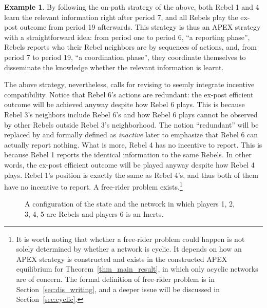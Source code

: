 \documentclass[12pt,letter]{article}
\theoremstyle{definition}
\newtheorem{example}{Example}
\theoremstyle{remark}
\theoremstyle{claim}
\begin{document}
\begin{example}
By following the on-path strategy of the above, both Rebel 1 and 4 learn the relevant information right after period 7, and all Rebels play the ex-post outcome from period 19 afterwards. This strategy is thus an APEX strategy with a straightforward idea: from period one to period 6, ``a {reporting phase}'', Rebels reports who their Rebel neighbors are by sequences of actions, and, from period 7 to period 19, ``a {coordination phase}'', they coordinate themselves to disseminate the knowledge whether the relevant information is learnt. 
\end{example}

The above strategy, nevertheless, calls for revising to seemly integrate incentive compatibility. Notice that Rebel 6's actions are redundant: the ex-post efficient outcome will be achieved anyway despite how Rebel 6 plays. This is because Rebel 3's neighbors include Rebel 6's and how Rebel 6 plays cannot be observed by other Rebels outside Rebel 3's neighborhood. The notion ``redundant'' will be replaced by and formally defined as \textit{inactive} later to emphasize that Rebel 6 can actually report nothing. What is more, Rebel 4 has no incentive to report. This is because Rebel 1 reports the identical information to the same Rebels. In other words, the ex-post efficient outcome will be played anyway despite how Rebel 4 plays. Rebel 1's position is exactly the same as Rebel 4's, and thus both of them have no incentive to report. A free-rider problem exists.\footnote{It is worth noting that whether a free-rider problem could happen is not solely determined by whether a network is cyclic. It depends on how an APEX strategy is constructed and exists in the constructed APEX equilibrium for Theorem~\ref{thm_main_result}, in which only acyclic networks are of concern. The formal definition of free-rider problem is in Section~\ref{sec:dis_writing}, and a deeper issue will be discussed in Section~\ref{sec:cyclic}.} 

\begin{figure}
\begin{center}
\end{center}
\caption{A configuration of the state and the network in which players 1, 2, 3, 4, 5 are Rebels and players 6 is an Inerts.}
\label{fig:circle_with_bridge_5}
\end{figure}
\end{document}
